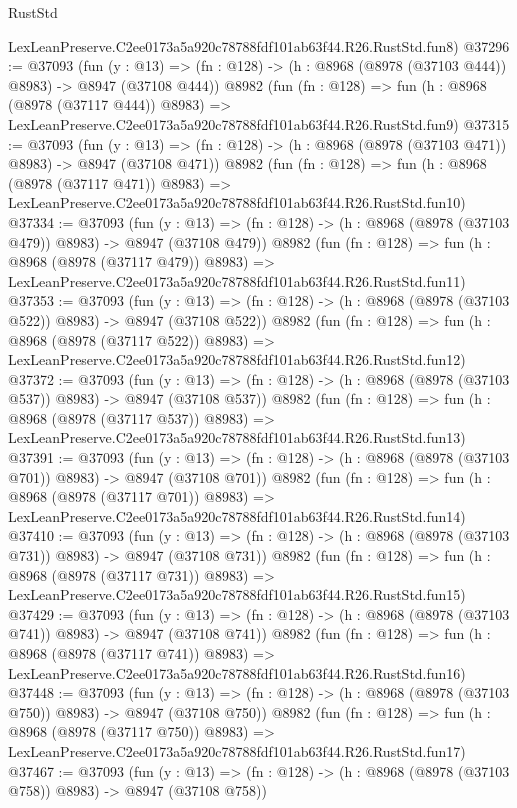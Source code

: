 \begin{lexlean}{RustStd}
\begin{coremodule}
    LexLeanPreserve.C2ee0173a5a920c78788fdf101ab63f44.R26.RustStd.fun8)
@37296 := @37093
    (fun (y : @13) => (fn : @128) -> (h : @8968 (@8978 (@37103 @444)) @8983) -> @8947 (@37108 @444))
    @8982
    (fun (fn : @128) =>
    fun (h : @8968 (@8978 (@37117 @444)) @8983) =>
    LexLeanPreserve.C2ee0173a5a920c78788fdf101ab63f44.R26.RustStd.fun9)
@37315 := @37093
    (fun (y : @13) => (fn : @128) -> (h : @8968 (@8978 (@37103 @471)) @8983) -> @8947 (@37108 @471))
    @8982
    (fun (fn : @128) =>
    fun (h : @8968 (@8978 (@37117 @471)) @8983) =>
    LexLeanPreserve.C2ee0173a5a920c78788fdf101ab63f44.R26.RustStd.fun10)
@37334 := @37093
    (fun (y : @13) => (fn : @128) -> (h : @8968 (@8978 (@37103 @479)) @8983) -> @8947 (@37108 @479))
    @8982
    (fun (fn : @128) =>
    fun (h : @8968 (@8978 (@37117 @479)) @8983) =>
    LexLeanPreserve.C2ee0173a5a920c78788fdf101ab63f44.R26.RustStd.fun11)
@37353 := @37093
    (fun (y : @13) => (fn : @128) -> (h : @8968 (@8978 (@37103 @522)) @8983) -> @8947 (@37108 @522))
    @8982
    (fun (fn : @128) =>
    fun (h : @8968 (@8978 (@37117 @522)) @8983) =>
    LexLeanPreserve.C2ee0173a5a920c78788fdf101ab63f44.R26.RustStd.fun12)
@37372 := @37093
    (fun (y : @13) => (fn : @128) -> (h : @8968 (@8978 (@37103 @537)) @8983) -> @8947 (@37108 @537))
    @8982
    (fun (fn : @128) =>
    fun (h : @8968 (@8978 (@37117 @537)) @8983) =>
    LexLeanPreserve.C2ee0173a5a920c78788fdf101ab63f44.R26.RustStd.fun13)
@37391 := @37093
    (fun (y : @13) => (fn : @128) -> (h : @8968 (@8978 (@37103 @701)) @8983) -> @8947 (@37108 @701))
    @8982
    (fun (fn : @128) =>
    fun (h : @8968 (@8978 (@37117 @701)) @8983) =>
    LexLeanPreserve.C2ee0173a5a920c78788fdf101ab63f44.R26.RustStd.fun14)
@37410 := @37093
    (fun (y : @13) => (fn : @128) -> (h : @8968 (@8978 (@37103 @731)) @8983) -> @8947 (@37108 @731))
    @8982
    (fun (fn : @128) =>
    fun (h : @8968 (@8978 (@37117 @731)) @8983) =>
    LexLeanPreserve.C2ee0173a5a920c78788fdf101ab63f44.R26.RustStd.fun15)
@37429 := @37093
    (fun (y : @13) => (fn : @128) -> (h : @8968 (@8978 (@37103 @741)) @8983) -> @8947 (@37108 @741))
    @8982
    (fun (fn : @128) =>
    fun (h : @8968 (@8978 (@37117 @741)) @8983) =>
    LexLeanPreserve.C2ee0173a5a920c78788fdf101ab63f44.R26.RustStd.fun16)
@37448 := @37093
    (fun (y : @13) => (fn : @128) -> (h : @8968 (@8978 (@37103 @750)) @8983) -> @8947 (@37108 @750))
    @8982
    (fun (fn : @128) =>
    fun (h : @8968 (@8978 (@37117 @750)) @8983) =>
    LexLeanPreserve.C2ee0173a5a920c78788fdf101ab63f44.R26.RustStd.fun17)
@37467 := @37093
    (fun (y : @13) => (fn : @128) -> (h : @8968 (@8978 (@37103 @758)) @8983) -> @8947 (@37108 @758))

\end{coremodule}
\end{lexlean}

